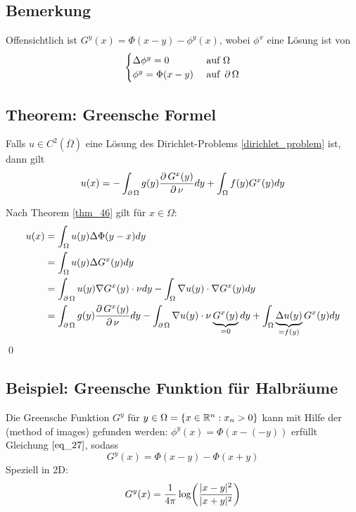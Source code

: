 \subsection{Bemerkung}
\label{bem_47}
	Offensichtlich ist $G^y(x) = \Phi(x-y)-\phi^y(x)$, wobei $\phi^x$ eine Lösung ist von \marginnote{[47]}
	\begin{equation} \begin{cases}
		\Delta \phi^y = 0 & \text{ auf } \Omega \\
		\phi^y = \Phi(x-y) & \text{ auf } \operatorname{\partial} \Omega \end{cases} \label{eq_27}
	\end{equation}

\subsection{Theorem: Greensche Formel}
\label{thm_48} \label{green_formel}
	Falls $u \in C^2(\overline{\Omega})$ eine Lösung des Dirichlet-Problems \eqref{dirichlet_problem} ist, dann gilt \marginnote{[48]}
	\[ u(x) = -\int_{\operatorname{\partial} \Omega} g(y) \frac{\operatorname{\partial} G^x(y)}{\operatorname{\partial} \nu} dy + \int_{\Omega} f(y) G^x(y) dy \]
	
	Nach Theorem \ref{thm_46} gilt für $x \in \Omega$:
	\begin{equation}
	\begin{aligned}
	 u(x) 	&= \int_{\Omega} u(y) \Delta \Phi(y-x) dy \\ \notag
			&= \int_{\Omega} u(y) \Delta G^x(y) dy \\
			&= \int_{\operatorname{\partial} \Omega} u(y) \nabla G^x(y) \cdot \nu dy - \int_\Omega \nabla u(y) \cdot \nabla G^x(y) dy \\
			&= \int_{\operatorname{\partial} \Omega} g(y) \frac{\operatorname{\partial} G^x(y)}{\operatorname{\partial} \nu} dy - \int_{\operatorname{\partial} \Omega} \nabla u(y) \cdot \nu \underbrace{G^x(y)}_{=0} dy + \int_{\Omega} \underbrace{\Delta u(y)}_{=f(y)} G^x(y) dy
	\end{aligned}
	\end{equation} \qed
	
\subsection{Beispiel: Greensche Funktion für Halbräume}
\label{bsp_49}
	Die Greensche Funktion $G^y$ \marginnote{[49]} für $y \in \Omega = \{x \in \mathbb{R}^n : x_n > 0\}$ kann mit Hilfe der  (method of images) gefunden werden: $\phi^y(x) = \Phi(x-(-y))$ erfüllt Gleichung $\eqref{eq_27}$, sodass
	\[ G^y(x) = \Phi(x-y) - \Phi(x+y) \]
	Speziell in 2D:
	\[ G^y(x) = \frac{1}{4\pi} \log \enbrace*{ \frac{|x-y|^2}{|x+y|^2}}\]
	
